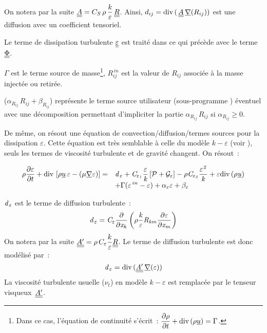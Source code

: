 On notera par la suite $\displaystyle \underline{\underline{A}} = C_S\,\rho\,\frac{k}{\varepsilon}\,\underline{\underline{R}}$. Ainsi, $\displaystyle d_{ij} = \text{div}\,(\,\underline{\underline{A}}\,\underline{\nabla}(R_{ij}))$ est une diffusion avec un coefficient tensoriel.

Le terme de dissipation turbulente $\underline{\underline{\varepsilon}}$ est traité dans ce qui précède avec le terme $\underline{\underline{\Phi}}$.

$\Gamma$ est le terme source de masse\footnote{Dans ce cas, l'équation de continuité s'écrit~: $\displaystyle \frac{\partial \rho}{\partial t} + \text{div}\,{(\rho \underline{u})} = \Gamma$.}, $R^{\,in}_{ij}$ est la valeur de $R_{ij}$ associée à la masse injectée ou retirée.

($\alpha_{R_{ij}}\,R_{ij} + \beta_{R_{ij}}$) représente le terme source
utilisateur (sous-programme ) éventuel avec une décomposition
permettant d'impliciter la partie $\alpha_{R_{ij}}\,R_{ij}$ si $\alpha_{R_{ij}} \geqslant 0$.

De même, on résout une équation de convection/diffusion/termes sources pour la dissipation $\varepsilon$. Cette équation est très semblable à celle du modèle $k-\varepsilon$ (voir ), seuls les termes de viscosité turbulente et de gravité changent. On résout~:

\begin{equation}
\begin{array} {ll}
\displaystyle \rho\frac{\partial \varepsilon}{\partial t} +
\text{div}\,\left[\rho \underline{u}\,\varepsilon-
(\mu \underline{\nabla}{\varepsilon})\right] = &
\displaystyle \it{d}_{\,\varepsilon}
+ C_{\varepsilon_1}\frac{\varepsilon}{k}\left[\mathcal{P}
+\mathcal{G}_{\varepsilon}\right]
-\rho C_{\varepsilon_2}\frac{\varepsilon^2}{k}
+\varepsilon\text{div}\,(\rho\underline{u})\\
&
\displaystyle
+\Gamma(\varepsilon^{\,in}-\varepsilon)
+\alpha_\varepsilon \varepsilon +\beta_\varepsilon
\end{array}
\end{equation}


$\it{d}_{\,\varepsilon}$ est le terme de diffusion turbulente~:
\begin{equation}
\displaystyle
\it{d}_{\,\varepsilon} = C_{\varepsilon} \displaystyle \frac{\partial}{\partial x_k} \left( \rho \frac{k}{\varepsilon} R_{km} \frac{\partial \varepsilon}{\partial x_m} \right)
\end{equation}
On notera par la suite $\underline{\underline{A'}} = \displaystyle \rho \,C_{\varepsilon} \frac{k}{\varepsilon} \underline{\underline{R}}$.
Le terme de diffusion turbulente est donc modélisé par~: $$\it{d}_{\,\varepsilon} =
\text{div}\,(\underline{\underline{A'}}\,\underline{\nabla}(\varepsilon))$$
La viscosité turbulente usuelle ($\nu_t$) en modèle $k-\varepsilon$ est remplacée par le tenseur visqueux~$\underline{\underline{A'}}$.

